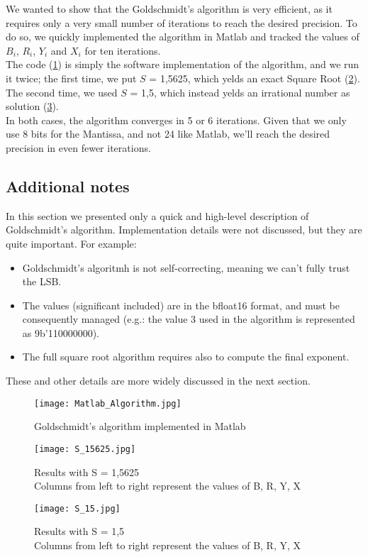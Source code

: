 We wanted to show that the Goldschmidt's algorithm is very efficient, as it requires only a very small number of iterations to reach the desired precision. To do so, we quickly implemented the algorithm in Matlab and tracked the values of $B_i$, $R_i$, $Y_i$ and $X_i$ for ten iterations.\\ The code (\ref{fig:Matlab_Algorithm}) is simply the software implementation of the algorithm, and we run it twice; the first time, we put $S$ = 1,5625, which yelds an exact Square Root (\ref{fig:S_15625}).  The second time, we used $S$ = 1,5, which instead yelds an irrational number as solution (\ref{fig:S_15}).\\
In both cases, the algorithm converges in 5 or 6 iterations. Given that we only use 8 bits for the Mantissa, and not 24 like Matlab, we'll reach the desired precision in even fewer iterations.

\subsection{Additional notes}
In this section we presented only a quick and high-level description of Goldschmidt's algorithm. Implementation details were not discussed, but they are quite important. For example:
\begin{itemize}
\item Goldschmidt's algoritmh is not self-correcting, meaning we can't fully trust the LSB.
\item The values (significant included) are in the bfloat16 format, and must be consequently managed (e.g.: the value 3 used in the algorithm is represented as 9b'110000000).
\item The full square root algorithm requires also to compute the final exponent.
\end{itemize}
These and other details are more widely discussed in the next section.
\begin{figure}[h]
	\centering
	\captionsetup{justification=centering}
	\texttt{[image: Matlab\_Algorithm.jpg]}	
	\caption{Goldschmidt's algorithm implemented in Matlab}
	\label {fig:Matlab_Algorithm}
\end{figure}

\begin{figure}[h]
	\centering
	\captionsetup{justification=centering}
	\texttt{[image: S\_15625.jpg]}	
	\caption{Results with S = 1,5625\\Columns from left to right represent the values of B, R, Y, X}
	\label {fig:S_15625}
\end{figure}


\begin{figure}[h]
	\centering
	\captionsetup{justification=centering}
	\texttt{[image: S\_15.jpg]}	
	\caption{Results with S = 1,5\\Columns from left to right represent the values of B, R, Y, X}
	\label {fig:S_15}
\end{figure}

\clearpage
